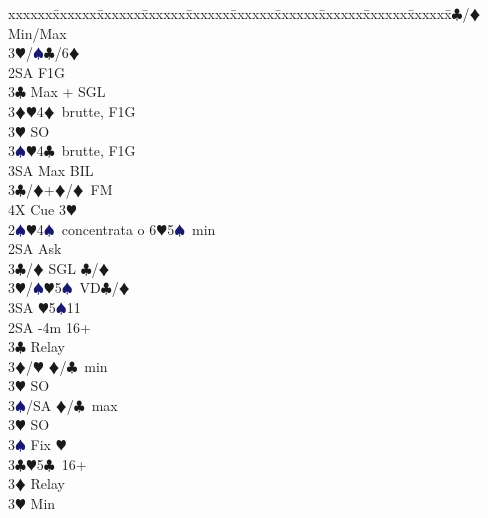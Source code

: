 \documentclass[a4paper,italian]{article}
\newcommand{\BC}{\textcolor{OliveGreen}{$\clubsuit$}}
\newcommand{\BD}{\textcolor{RedOrange}{$\vardiamondsuit$}}
\newcommand{\BH}{\textcolor{Red2}{$\varheartsuit${}}}
\newcommand{\BS}{\textcolor{MidnightBlue}{$\spadesuit${}}}
\newenvironment{bidtable}
{\begin{tabbing}

    xxxxxx\=xxxxxx\=xxxxxx\=xxxxxx\=xxxxxx\=xxxxxx\=xxxxxx\=xxxxxx\=xxxxxx\=xxxxxx\=\kill}
{\end{tabbing} }%
\begin{document}
\begin{multicols*}{2}
\begin{bidtable}
                                            3\BC/\BD \> Min/Max\\
                                            3\BH/\BS {}\BC /6\BD \-\-\\
                                            2SA \> F1G\+\\
                                            3\BC \> Max + SGL\\
                                            3\BD {}\BH4\BD\ brutte, F1G\\
                                            3\BH \> SO\\
                                            3\BS {}\BH4\BC\ brutte, F1G\\
                                            3SA \> Max BIL\-\\
                                            3\BC/\BD {}+\BD /\BD\ FM\\
                                            4X \> Cue 3\BH \-\\
                                            2\BS {}\BH 4\BS\ concentrata o 6\BH 5\BS\ min\+\\
                                            2SA \> Ask\+\\
                                            3\BC/\BD \> SGL \BC /\BD \\
                                            3\BH/\BS {}\BH 5\BS\ VD\BC /\BD \\
                                            3SA \BH 5\BS 11\-\-\\
                                            2SA -4m 16+\+\\
                                            3\BC \> Relay\+\\
                                            3\BD/\BH \> \BD /\BC\ min\+\\
                                            3\BH \> SO\-\\
                                            3\BS/SA \> \BD /\BC\ max\-\\
                                            3\BH \> SO\\
                                            3\BS \> Fix \BH\-\\
                                            3\BC {}\BH 5\BC\ 16+\+\\
                                            3\BD \> Relay\+\\
                                            3\BH \> Min\+\\

\end{bidtable}
\end{multicols*}
\end{document}
